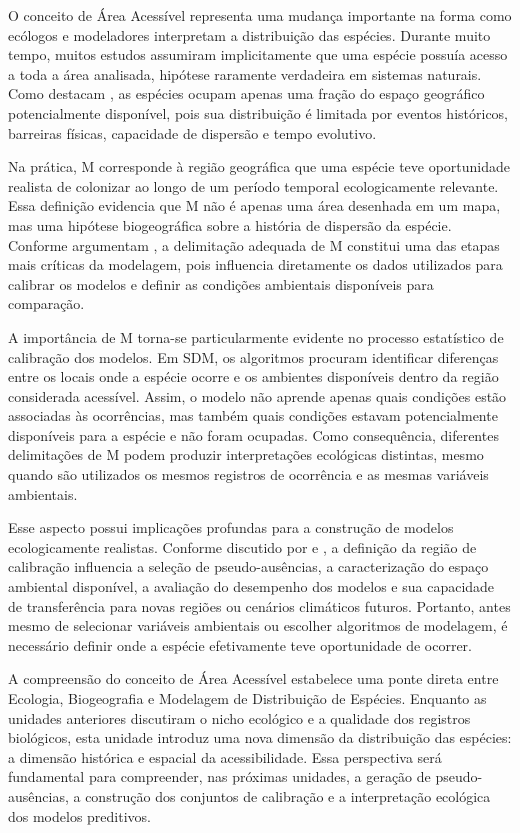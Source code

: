 O conceito de Área Acessível representa uma mudança importante na forma como ecólogos e modeladores interpretam a distribuição das espécies. Durante muito tempo, muitos estudos assumiram implicitamente que uma espécie possuía acesso a toda a área analisada, hipótese raramente verdadeira em sistemas naturais. Como destacam \textcite{Peterson2011}, as espécies ocupam apenas uma fração do espaço geográfico potencialmente disponível, pois sua distribuição é limitada por eventos históricos, barreiras físicas, capacidade de dispersão e tempo evolutivo.

Na prática, M corresponde à região geográfica que uma espécie teve oportunidade realista de colonizar ao longo de um período temporal ecologicamente relevante. Essa definição evidencia que M não é apenas uma área desenhada em um mapa, mas uma hipótese biogeográfica sobre a história de dispersão da espécie. Conforme argumentam \textcite{Barve2011}, a delimitação adequada de M constitui uma das etapas mais críticas da modelagem, pois influencia diretamente os dados utilizados para calibrar os modelos e definir as condições ambientais disponíveis para comparação.

A importância de M torna-se particularmente evidente no processo estatístico de calibração dos modelos. Em SDM, os algoritmos procuram identificar diferenças entre os locais onde a espécie ocorre e os ambientes disponíveis dentro da região considerada acessível. Assim, o modelo não aprende apenas quais condições estão associadas às ocorrências, mas também quais condições estavam potencialmente disponíveis para a espécie e não foram ocupadas. Como consequência, diferentes delimitações de M podem produzir interpretações ecológicas distintas, mesmo quando são utilizados os mesmos registros de ocorrência e as mesmas variáveis ambientais.

Esse aspecto possui implicações profundas para a construção de modelos ecologicamente realistas. Conforme discutido por \textcite{Elith2009} e \textcite{Guisan2017}, a definição da região de calibração influencia a seleção de pseudo-ausências, a caracterização do espaço ambiental disponível, a avaliação do desempenho dos modelos e sua capacidade de transferência para novas regiões ou cenários climáticos futuros. Portanto, antes mesmo de selecionar variáveis ambientais ou escolher algoritmos de modelagem, é necessário definir onde a espécie efetivamente teve oportunidade de ocorrer.

A compreensão do conceito de Área Acessível estabelece uma ponte direta entre Ecologia, Biogeografia e Modelagem de Distribuição de Espécies. Enquanto as unidades anteriores discutiram o nicho ecológico e a qualidade dos registros biológicos, esta unidade introduz uma nova dimensão da distribuição das espécies: a dimensão histórica e espacial da acessibilidade. Essa perspectiva será fundamental para compreender, nas próximas unidades, a geração de pseudo-ausências, a construção dos conjuntos de calibração e a interpretação ecológica dos modelos preditivos.

